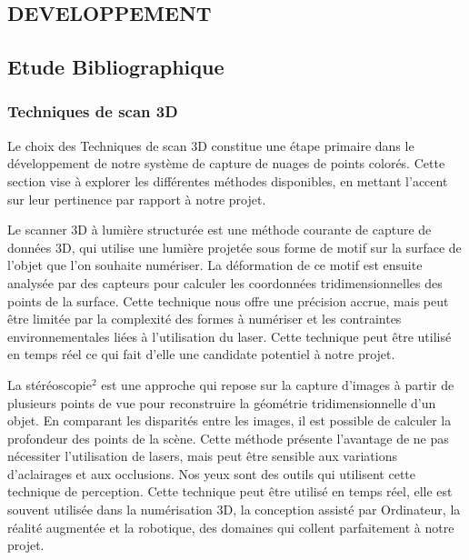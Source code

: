 \pagestyle{empty} %
\begin{center}
    \section{\huge\textbf{{DEVELOPPEMENT}}}
\end{center}


\subsection{Etude Bibliographique}
    \subsubsection{Techniques de scan 3D}
        \normalsize{
        \setlength{\parindent}{1cm} %
            Le choix des Techniques de scan 3D constitue une étape primaire dans le développement de notre système de capture de nuages de points colorés. Cette section vise à explorer les différentes méthodes disponibles, en mettant l'accent sur leur pertinence par rapport à notre projet.
        }

            \normalsize{
             \setlength{\parindent}{1cm} %
                Le scanner 3D à lumière structurée \cite{lumiere_structuree} est une méthode courante de capture de données 3D, qui utilise une lumière projetée sous forme de motif sur la surface de l'objet que l'on souhaite numériser. La déformation de ce motif est ensuite analysée par des capteurs pour calculer les coordonnées tridimensionnelles des points de la surface. Cette technique nous offre une précision accrue, mais peut être limitée par la complexité des formes à numériser et les contraintes environnementales liées à l'utilisation du laser. Cette technique peut être utilisé en temps réel ce qui fait d'elle une candidate potentiel à notre projet.
            }

            \normalsize{  
            \setlength{\parindent}{1cm} %
                La stéréoscopie$^2$ \cite{stereovision} est une approche qui repose sur la capture d'images à partir de plusieurs points de vue pour reconstruire la géométrie tridimensionnelle d'un objet. En comparant les disparités entre les images, il est possible de calculer la profondeur des points de la scène. Cette méthode présente l'avantage de ne pas nécessiter l'utilisation de lasers, mais peut être sensible aux variations d'aclairages et aux occlusions. Nos yeux sont des outils qui utilisent cette technique de perception. Cette technique peut être utilisé en temps réel, elle est souvent utilisée dans la numérisation 3D, la conception assisté par Ordinateur, la réalité augmentée et la robotique, des domaines qui collent parfaitement à notre projet.
            }


